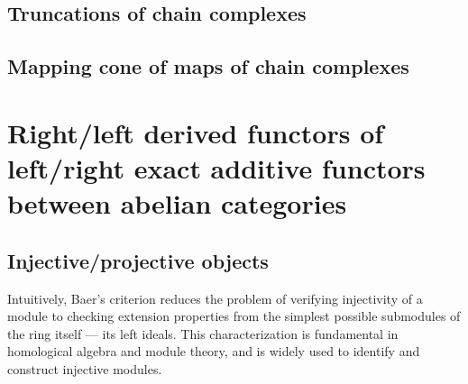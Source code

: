 \subsection{Truncations of chain complexes}





\subsection{Mapping cone of maps of chain complexes}







\section{Right/left derived functors of left/right exact additive functors between abelian categories}

\subsection{Injective/projective objects}












Intuitively, Baer's criterion reduces the problem of verifying injectivity of a module to checking extension properties from the simplest possible submodules of the ring itself — its left ideals. This characterization is fundamental in homological algebra and module theory, and is widely used to identify and construct injective modules.


